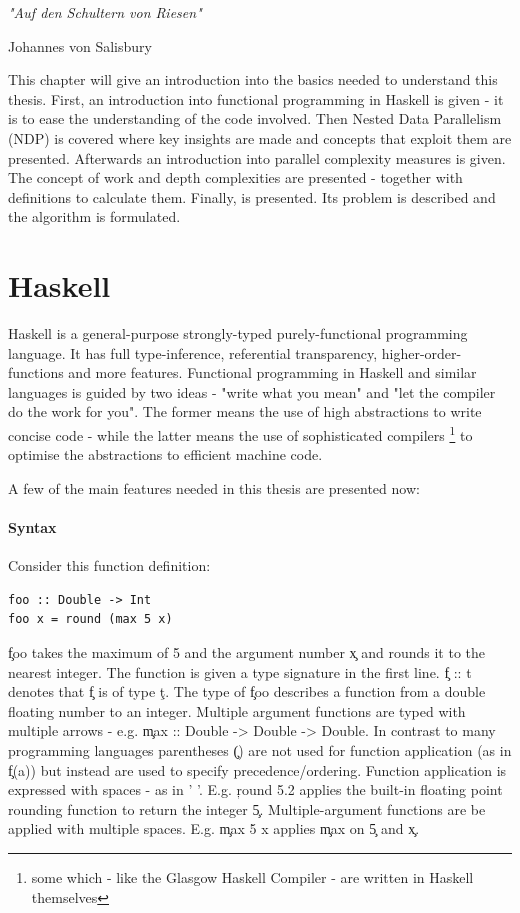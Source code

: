 
\epigraph{\emph{
"Auf den Schultern von Riesen"
}}{
Johannes von Salisbury
}

This chapter will give an introduction into the basics needed to
understand this thesis. First, an introduction into functional programming
in Haskell is given - it is to ease the understanding of the code involved.
Then Nested Data Parallelism (NDP) is covered where
key insights are made and concepts that exploit them are presented.
Afterwards an introduction into parallel complexity measures is given.
The concept of work and depth complexities are presented
- together with definitions to calculate them.
Finally, \algo is presented. Its problem is described and
the algorithm is formulated.

\section{Haskell}
  Haskell is a general-purpose strongly-typed purely-functional programming
  language. It has full type-inference, referential transparency, higher-order-functions
  and more features. Functional programming in Haskell and similar languages
  is guided by two ideas - "write what you mean" and "let the compiler do the work for you".
  The former means the use of high abstractions to write concise code -
  while the latter means the use of sophisticated compilers
  \footnote{some which - like the Glasgow Haskell Compiler - are written in Haskell themselves}
  to optimise the abstractions to efficient machine code.
  
  A few of the main features needed in this thesis are presented now:
  
  
  \paragraph{Syntax}
    Consider this function definition:
    \begin{lstlisting}
foo :: Double -> Int
foo x = round (max 5 x)
    \end{lstlisting}
    \c{foo} takes the maximum of 5 and the argument number \c{x} and
    rounds it to the nearest integer. The function is given a type
    signature in the first line. \c{f :: t} denotes that \c{f} is of type \c{t}.
    The type of \c{foo} describes a function from a double floating number
    to an integer. Multiple argument functions are typed with multiple arrows
    - e.g. \c{max :: Double -> Double -> Double}.
    In contrast to many programming languages parentheses \c{()} are not used for function application
    (as in \c{f(a)}) but instead are used to specify precedence/ordering.
    Function application is expressed with spaces - as in ' '. E.g. \c{round 5.2} applies the built-in
    floating point rounding function to return the integer \c{5}. Multiple-argument
    functions are be applied with multiple spaces. E.g. \c{max 5 x}
    applies \c{max} on \c{5} and \c{x}.
    
